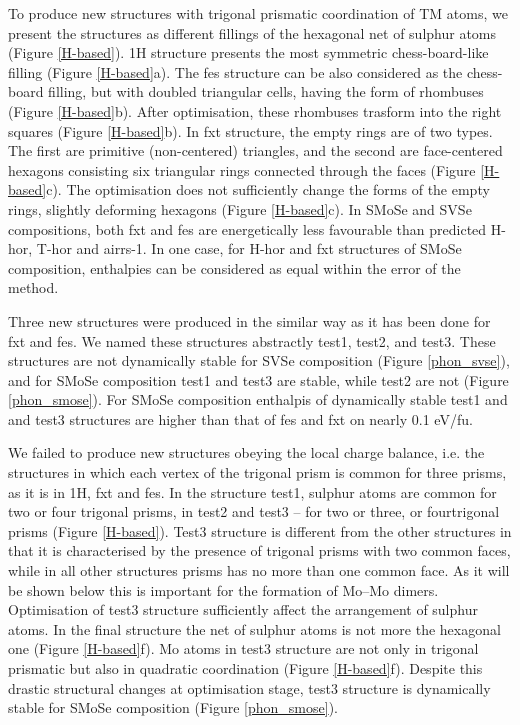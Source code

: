 \documentclass[a4paperm]{article}
\begin{document}
To produce new structures with trigonal prismatic coordination of TM atoms, we present the structures as different fillings of the hexagonal net of sulphur atoms (Figure \ref{H-based}).
1H structure presents the most symmetric chess-board-like filling (Figure \ref{H-based}a).
The fes structure can be also considered as the chess-board filling, but with doubled triangular cells, having the form of rhombuses (Figure \ref{H-based}b).
After optimisation, these rhombuses trasform into the right squares (Figure \ref{H-based}b).
In fxt structure, the empty rings are of two types.
The first are primitive (non-centered) triangles, and the second are face-centered hexagons consisting six triangular rings connected through the faces (Figure \ref{H-based}c).
The optimisation does not sufficiently change the forms of the empty rings, slightly deforming hexagons (Figure \ref{H-based}c).
In SMoSe and SVSe compositions, both fxt and fes are energetically less favourable than predicted H-hor, T-hor and airrs-1.
In one case, for H-hor and fxt structures of SMoSe composition, enthalpies can be considered as equal within the error of the method.

Three new structures were produced in the similar way as it has been done for fxt and fes.
We named these structures abstractly test1, test2, and test3.
These structures are not dynamically stable for SVSe composition (Figure \ref{phon_svse}), and for SMoSe composition test1 and test3 are stable, while test2 are not (Figure \ref{phon_smose}).
For SMoSe composition enthalpis of dynamically stable test1 and and test3 structures are higher than that of  fes and fxt on nearly 0.1 eV/fu.

We failed to produce new structures obeying the local charge balance, i.e. the structures in which each vertex of the trigonal prism is common for three prisms, as it is in 1H, fxt and fes.
In the structure test1, sulphur atoms are common for two or four trigonal prisms, in test2 and test3 – for two or three, or fourtrigonal prisms (Figure \ref{H-based}).
Test3 structure is different from the other structures in that it is characterised by the presence of trigonal prisms with two common faces, while in all other structures prisms has no more than one common face.
As it will be shown below this is important for the formation of Mo--Mo dimers.
Optimisation of test3 structure sufficiently affect the arrangement of sulphur atoms.
In the final structure the net of sulphur atoms is not more the hexagonal one (Figure \ref{H-based}f).
Mo atoms in test3 structure are not only in trigonal prismatic but also in quadratic coordination (Figure \ref{H-based}f).
Despite this drastic structural changes at optimisation stage, test3 structure is dynamically stable for SMoSe composition (Figure \ref{phon_smose}).
\end{document}
